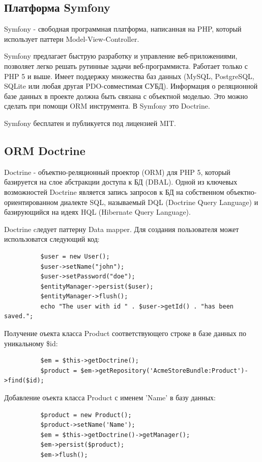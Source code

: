 \subsection{Платформа Symfony}
\label{sub:practice:symfony}

Symfony - свободная программная платформа, написанная на PHP, который использует паттерн Model-View-Controller.

Symfony предлагает быструю разработку и управление веб-приложениями, позволяет легко решать рутинные задачи веб-программиста. Работает только с PHP 5 и выше. Имеет поддержку множества баз данных (MySQL, PostgreSQL, SQLite или любая другая PDO-совместимая СУБД). Информация о реляционной базе данных в проекте должна быть связана с объектной моделью. Это можно сделать при помощи ORM инструмента. В Symfony это Doctrine.

Symfony бесплатен и публикуется под лицензией MIT.

\subsection{ORM Doctrine}
\label{sub:practice:doctrine}
Doctrine - объектно-реляционный проектор (ORM) для PHP 5, который базируется на слое абстракции доступа к БД (DBAL). Одной из ключевых возможностей Doctrine является запись запросов к БД на собственном объектно-ориентированном диалекте SQL, называемый DQL (Doctrine Query Language) и базирующийся на идеях HQL (Hibernate Query Language).

Doctrine cледует паттерну Data mapper. Для создания пользователя может использоватся следующий код:

\begin{lstlisting}
          $user = new User();
          $user->setName("john");
          $user->setPassword("doe");
          $entityManager->persist($user);
          $entityManager->flush();
          echo "The user with id " . $user->getId() . "has been saved.";
\end{lstlisting}


Получение оъекта класса Product соответствующего строке в базе данных по уникальному \$id:
\begin{lstlisting}
          $em = $this->getDoctrine();
          $product = $em->getRepository('AcmeStoreBundle:Product')->find($id);
\end{lstlisting}

Добавление оъекта класса Product с именем 'Name' в базу данных:
\begin{lstlisting}
          $product = new Product();
          $product->setName('Name');
          $em = $this->getDoctrine()->getManager();
          $em->persist($product);
          $em->flush();
\end{lstlisting}

